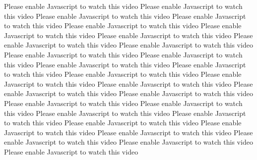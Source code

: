 \documentclass{article}%
\begin{document}
Please enable Javascript to watch this video\newline%
Please enable Javascript to watch this video\newline%
Please enable Javascript to watch this video\newline%
Please enable Javascript to watch this video\newline%
Please enable Javascript to watch this video\newline%
Please enable Javascript to watch this video\newline%
Please enable Javascript to watch this video\newline%
Please enable Javascript to watch this video\newline%
Please enable Javascript to watch this video\newline%
Please enable Javascript to watch this video\newline%
Please enable Javascript to watch this video\newline%
Please enable Javascript to watch this video\newline%
Please enable Javascript to watch this video\newline%
Please enable Javascript to watch this video\newline%
Please enable Javascript to watch this video\newline%
Please enable Javascript to watch this video\newline%
Please enable Javascript to watch this video\newline%
Please enable Javascript to watch this video\newline%
Please enable Javascript to watch this video\newline%
Please enable Javascript to watch this video\newline%
Please enable Javascript to watch this video\newline%
Please enable Javascript to watch this video\newline%
Please enable Javascript to watch this video\newline%
Please enable Javascript to watch this video\newline%
Please enable Javascript to watch this video\newline%
Please enable Javascript to watch this video\newline%
Please enable Javascript to watch this video\newline%
Please enable Javascript to watch this video\newline%
\end{document}
